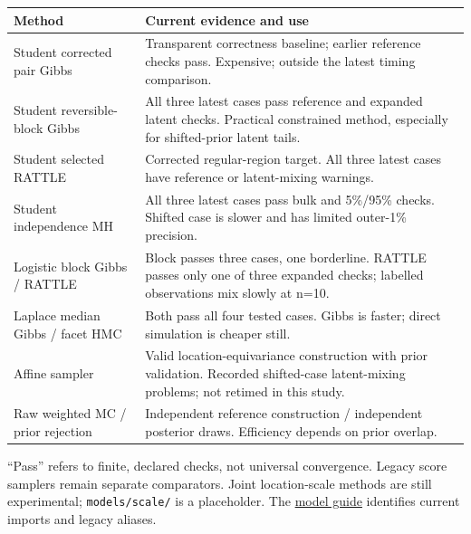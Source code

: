 \documentclass[
  10pt,
]{article}
\begin{document}
\begin{longtable}[]{@{}
  >{\raggedright\arraybackslash}p{}
  >{\raggedright\arraybackslash}p{}@{}}
\toprule\noalign{}
\begin{minipage}[b]{\linewidth}\raggedright
Method
\end{minipage} & \begin{minipage}[b]{\linewidth}\raggedright
Current evidence and use
\end{minipage} \\
\midrule\noalign{}
\endhead
\bottomrule\noalign{}
\endlastfoot
Student corrected pair Gibbs & Transparent correctness baseline; earlier
reference checks pass. Expensive; outside the latest timing
comparison. \\
Student reversible-block Gibbs & All three latest cases pass reference
and expanded latent checks. Practical constrained method, especially for
shifted-prior latent tails. \\
Student selected RATTLE & Corrected regular-region target. All three
latest cases have reference or latent-mixing warnings. \\
Student independence MH & All three latest cases pass bulk and 5\%/95\%
checks. Shifted case is slower and has limited outer-1\% precision. \\
Logistic block Gibbs / RATTLE & Block passes three cases, one
borderline. RATTLE passes only one of three expanded checks; labelled
observations mix slowly at n=10. \\
Laplace median Gibbs / facet HMC & Both pass all four tested cases.
Gibbs is faster; direct simulation is cheaper still. \\
Affine sampler & Valid location-equivariance construction with prior
validation. Recorded shifted-case latent-mixing problems; not retimed in
this study. \\
Raw weighted MC / prior rejection & Independent reference construction /
independent posterior draws. Efficiency depends on prior overlap. \\
\end{longtable}

``Pass'' refers to finite, declared checks, not universal convergence.
Legacy score samplers remain separate comparators. Joint location-scale
methods are still experimental; \texttt{models/scale/} is a placeholder.
The \href{../../models/README.md}{model guide} identifies current
imports and legacy aliases.
\end{document}
